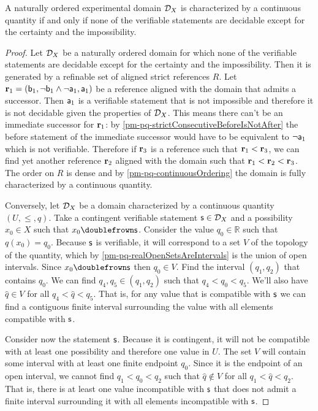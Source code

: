 \begin{mathSection}
	\begin{prop}
		A naturally ordered experimental domain $\edomain_X$ is characterized by a continuous quantity if and only if none of the verifiable statements are decidable except for the certainty and the impossibility.
	\end{prop}
	\begin{proof}
		Let $\edomain_X$ be a naturally ordered domain for which none of the verifiable statements are decidable except for the certainty and the impossibility. Then it is generated by a refinable set of aligned strict references $R$. Let $\refStmt_1=(\stmt[b]_1, \NOT \stmt[b]_1 \AND \NOT \stmt[a]_1, \stmt[a]_1)$ be a reference aligned with the domain that admits a successor. Then $\stmt[a]_1$ is a verifiable statement that is not impossible and therefore it is not decidable given the properties of $\edomain_X$. This means there can't be an immediate successor for $\refStmt_1$: by \ref{pm-pq-strictConsecutiveBeforeIsNotAfter} the before statement of the immediate successor would have to be equivalent to $\NOT\stmt[a]_1$ which is not verifiable. Therefore if $\refStmt_3$ is a reference such that $\refStmt_1 < \refStmt_3$, we can find yet another reference $\refStmt_2$ aligned with the domain such that $\refStmt_1 < \refStmt_2 < \refStmt_3$. The order on $R$ is dense and by \ref{pm-pq-continuousOrdering} the domain is fully characterized by a continuous quantity.
		
		Conversely, let $\edomain_X$ be a domain characterized by a continuous quantity $(U, \leq, q)$. Take a contingent verifiable statement $\stmt \in \edomain_X$ and a possibility $x_0 \in X$ such that $x_0 \comp \stmt$. Consider the value $q_0 \in \mathbb{R}$ such that $q(x_0) = q_0$. Because $\stmt$ is verifiable, it will correspond to a set $V$ of the topology of the quantity, which by \ref{pm-pq-realOpenSetsAreIntervals} is the union of open intervals. Since $x_0 \comp \stmt$ then $q_0 \in V$. Find the interval $(q_1, q_2)$ that contains $q_0$. We can find $q_4, q_5 \in (q_1, q_2)$ such that $q_4 < q_0 < q_5$. We'll also have $\hat{q} \in V$ for all $q_4 < \hat{q} < q_5$. That is, for any value that is compatible with $\stmt$ we can find a contiguous finite interval surrounding the value with all elements compatible with $\stmt$.
		
		Consider now the statement $\stmt$. Because it is contingent, it will not be compatible with at least one possibility and therefore one value in $U$. The set $V$ will contain some interval with at least one finite endpoint $q_0$. Since it is the endpoint of an open interval, we cannot find $q_1 < q_0 < q_2$ such that $\hat{q} \notin V$ for all $q_1 < \hat{q} < q_2$. That is, there is at least one value incompatible with $\stmt$ that does not admit a finite interval surrounding it with all elements incompatible with $\stmt$.
		

\end{proof}
\end{mathSection}
